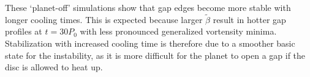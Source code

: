 These `planet-off' simulations show that gap edges become more stable with
longer cooling times. This is expected because larger $\tilde{\beta}$
result in hotter gap profiles at $t=30P_0$ with less pronounced
generalized vortensity minima. Stabilization with increased
cooling time is therefore due to a smoother basic state for the
instability, as it is more difficult for the planet to open a gap if
the disc is allowed to heat up. 
 






\begin{figure}
  \centering
\hfill
\end{figure}
